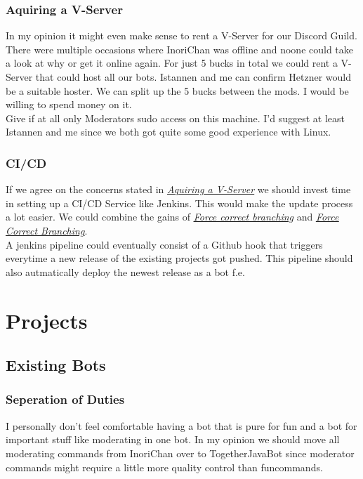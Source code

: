 \documentclass{article}
\newcommand{\refsection}[2]{\hyperref[#1]{\underline{\textit{#2}}}}
\begin{document}
    \subsubsection{Aquiring a V-Server}
    \label{sec:vserver}
    In my opinion it might even make sense to rent a V-Server for our Discord Guild. 
    There were multiple occasions where InoriChan was offline and noone could take a look at why or get it online again.
    For just 5 bucks in total we could rent a V-Server that could host all our bots. Istannen and me can confirm Hetzner would be a suitable hoster.
    We can split up the 5 bucks between the mods. I would be willing to spend money on it. \\
    Give if at all only Moderators sudo access on this machine. I'd suggest at least Istannen and me since we both got quite some good experience with Linux.

    \subsubsection{CI/CD}
    If we agree on the concerns stated in \hyperref[sec:vserver]{\underline{\textit{Aquiring a V-Server}}} we should invest time in setting up a CI/CD Service like Jenkins.
    This would make the update process a lot easier. We could combine the gains of \refsection{sec:forcecorrectbranching}{Force correct branching} 
    and \refsection{sec:forcepullrequests}{Force Correct Branching}. \\ 
    A jenkins pipeline could eventually consist of a Github hook that triggers everytime a new release of the existing projects got pushed. 
    This pipeline should also autmatically deploy the newest release as a bot f.e.

    \section{Projects}

    \subsection{Existing Bots}

    \subsubsection{Seperation of Duties}
    I personally don't feel comfortable having a bot that is pure for fun and a bot for important stuff like moderating in one bot. 
    In my opinion we should move all moderating commands from InoriChan over to TogetherJavaBot since moderator commands might require a little more quality control than funcommands.
\end{document}
